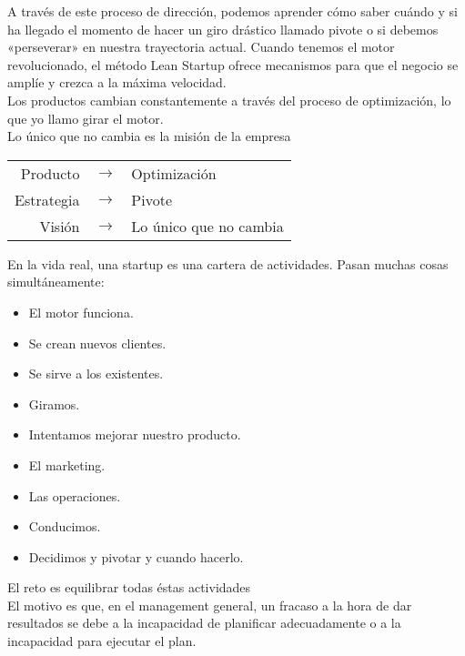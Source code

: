 \documentclass[10pt]{article}
\begin{document}
\begin{multicols}{2}
A través de este proceso de dirección, podemos aprender cómo saber cuándo y si ha llegado el momento de hacer un giro drástico llamado pivote o si debemos «perseverar» en nuestra trayectoria actual. Cuando tenemos el motor revolucionado, el método Lean Startup ofrece mecanismos para que el negocio se amplíe y crezca a la máxima velocidad.\\
Los productos cambian constantemente a través del proceso de optimización, lo que yo llamo girar el motor.\\
Lo único que no cambia es la misión de la empresa\\
\begin{center}
\begin{tabular}{r c l}
Producto&$\rightarrow$&Optimización\\
Estrategia&$\rightarrow$&Pivote\\
Visión&$\rightarrow$&Lo único que no cambia\\
\end{tabular}
\end{center}
En la vida real, una startup es una cartera de actividades. Pasan muchas cosas simultáneamente:
\begin{itemize}
\item El motor funciona.
\item Se crean nuevos clientes.
\item Se sirve a los existentes.
\item Giramos.
\item Intentamos mejorar nuestro producto.
\item El marketing.
\item Las operaciones.
\item Conducimos.
\item Decidimos y pivotar y cuando hacerlo.
\end{itemize}
El reto es equilibrar todas éstas actividades\\
{\color{blue}El motivo es que, en el management general, un fracaso a la hora de dar resultados se debe a la incapacidad de planificar adecuadamente o a la incapacidad para ejecutar el plan.}

\end{multicols}
\end{document}
